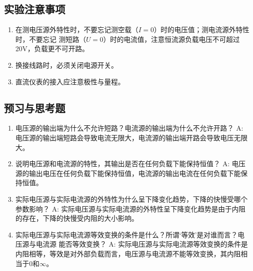 \documentclass[UTF8]{article}
\begin{document}
        \subsection{实验注意事项}
            \begin{enumerate}[label=\textbf{\arabic*}.]
                \item 在测电压源外特性时，不要忘记测空载（$I=0$）时的电压值；测电流源外特性时，不要忘记
                测短路（$U=0$）时的电流值，注意恒流源负载电压不可超过20V，负载更不可开路。
                \item 换接线路时，必须关闭电源开关。 
                \item 直流仪表的接入应注意极性与量程。 
            \end{enumerate}
        \subsection{预习与思考题}
            \begin{enumerate}[label=\textbf{\arabic*}.]
                \item 电压源的输出端为什么不允许短路？电流源的输出端为什么不允许开路？ \newline
                A: 电压源的输出端短路会导致电流无限大，电流源的输出端开路会导致电压无限大。
                \item 说明电压源和电流源的特性，其输出是否在任何负载下能保持恒值？\newline
                A: 电压源的输出电压在任何负载下能保持恒值，电流源的输出电流在任何负载下能保持恒值。
                \item 实际电压源与实际电流源的外特性为什么呈下降变化趋势，下降的快慢受哪个参数影响？\newline
                A: 实际电压源与实际电流源的外特性呈下降变化趋势是由于内阻的存在，下降的快慢受内阻的大小影响。
                \item 实际电压源与实际电流源等效变换的条件是什么？所谓‘等效’是对谁而言？电压源与电流源
                能否等效变换？ \newline
                A: 实际电压源与实际电流源等效变换的条件是内阻相等，等效是对外部负载而言，电压源与电流源不能等效变换，其内阻相当于$0$和$\infty$。
            \end{enumerate}
\end{document}
